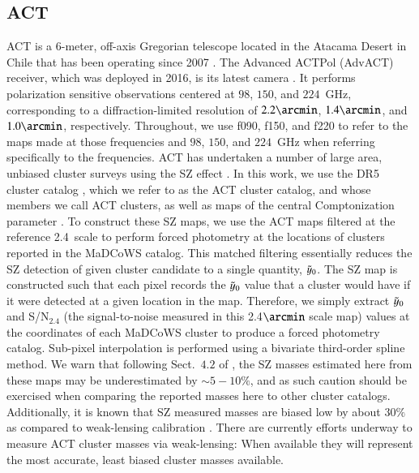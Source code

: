 \documentclass[longauth]{aa} %
\newcommand{\yc}{$\Tilde{\vary}_0$\xspace}
\begin{document}
\subsection{ACT}\label{sec:data:act}

ACT is a $6$-meter, off-axis Gregorian telescope located in the Atacama Desert in Chile that has been operating since 2007 \citep{Fowler2007}. The Advanced ACTPol (AdvACT) receiver, which was deployed in 2016, is its latest camera  \citep{Henderson2016, Thornton2016}. It performs polarization sensitive observations centered at $98$, $150$, and $224$~GHz, corresponding to a diffraction-limited resolution of $2.2\arcmin$, $1.4\arcmin$, and $1.0\arcmin$, respectively. Throughout, we use f090, f150, and f220 to refer to the maps made at those frequencies and $98$, $150$, and $224$~GHz when referring specifically to the frequencies. ACT has undertaken a number of large area, unbiased cluster surveys using the SZ effect \citep{Menanteau2010, Marriage2011, Sehgal2011, Hasselfield2013, Menanteau2013, Hilton2018, Hilton2021}. In this work, we use the DR5 cluster catalog \citep{Hilton2021}, which we refer to as the ACT cluster catalog, and whose members we call ACT clusters, as well as maps of the central Comptonization parameter \citep[\yc, often referred to as "SZ maps" in this work; see Sect. 2.3 of][]{Hilton2021}. To construct these SZ maps, we  use the ACT maps filtered at the reference 2.4\arcmin\ scale to perform forced photometry at the locations of clusters reported in the MaDCoWS catalog. This matched filtering essentially reduces the SZ detection of given cluster candidate to a single quantity, \yc. The SZ map is constructed such that each pixel records the $\Tilde{\vary}_0$ value that a cluster would have if it were detected at a given location in the map. Therefore, we simply extract $\Tilde{\vary}_0$ and S/N$_{2.4}$ (the signal-to-noise measured in this 2.4$\arcmin$ scale map) values at the coordinates of each MaDCoWS cluster to produce a forced photometry catalog. Sub-pixel interpolation is performed using a bivariate third-order spline method. We warn that following Sect.~$4.2$ of \citet{Hilton2021}, the SZ masses estimated here from these maps may be underestimated by $\sim5-10\%$, and as such caution should be exercised when comparing the reported masses here to other cluster catalogs. Additionally, it is known that SZ measured masses are biased low by about $30\%$ as compared to weak-lensing calibration \citep{Miyatake2019}. There are currently efforts underway to measure ACT cluster masses via weak-lensing: When available they will represent the most accurate, least biased cluster masses available.
\end{document}
